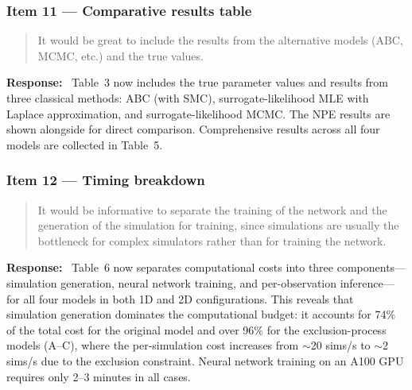 \documentclass[11pt,a4paper]{article}
\newenvironment{reviewercomment}{%
  \begin{quote}\itshape\color{reviewerblue}%
}{%
  \end{quote}%
}
\newcommand{\response}{\textbf{Response:}~}
\begin{document}
\subsubsection*{Item 11 --- Comparative results table}

\begin{reviewercomment}
It would be great to include the results from the alternative models (ABC, MCMC, etc.) and the true values.
\end{reviewercomment}

\response
Table~3 now includes the true parameter values and results from three classical methods: ABC (with SMC), surrogate-likelihood MLE with Laplace approximation, and surrogate-likelihood MCMC. The NPE results are shown alongside for direct comparison. Comprehensive results across all four models are collected in Table~5.


\subsubsection*{Item 12 --- Timing breakdown}

\begin{reviewercomment}
It would be informative to separate the training of the network and the generation of the simulation for training, since simulations are usually the bottleneck for complex simulators rather than for training the network.
\end{reviewercomment}

\response
Table~6 now separates computational costs into three components---simulation generation, neural network training, and per-observation inference---for all four models in both 1D and 2D configurations. This reveals that simulation generation dominates the computational budget: it accounts for 74\% of the total cost for the original model and over 96\% for the exclusion-process models (A--C), where the per-simulation cost increases from $\sim$20 sims/s to $\sim$2 sims/s due to the exclusion constraint. Neural network training on an A100 GPU requires only 2--3 minutes in all cases.
\end{document}
